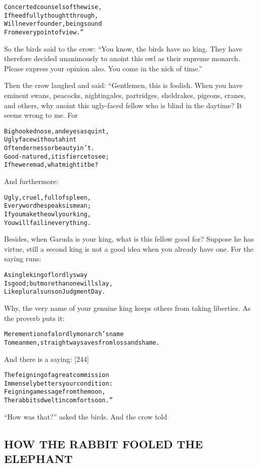 \documentclass{article}
\renewenvironment{verbatim}{\begin{alltt}\normalfont\begin{centering}}{\end{centering}\end{alltt}}
\begin{document}
\begin{verbatim}
Concerted counsels of the wise,
    If heedfully thought through,
Will never founder, being sound
    From every point of view.”
\end{verbatim}
So the birds said to the crow:
``You know, the birds have no king. They have therefore decided unanimously to anoint this owl as their supreme monarch. Please express your opinion also. You come in the nick of time.''

Then the crow laughed and said: “Gentlemen, this is foolish. When
you have eminent swans, peacocks, nightingales, partridges,
sheldrakes, pigeons, cranes, and others, why anoint this ugly-faced
fellow who is blind in the daytime? It seems wrong to me. For

\begin{verbatim}
Big hooked nose, and eyes asquint,
Ugly face without a hint
Of tenderness or beauty in 't.
Good-natured, it is fierce to see;
If he were mad, what might it be?
\end{verbatim}
And furthermore:

\begin{verbatim}
Ugly, cruel, full of spleen,
Every word he speaks is mean;
If you make the owl your king,
You will fail in everything.
\end{verbatim}
Besides, when Garuda is your king, what is this fellow good for?
Suppose he has virtue, still a second king is not a good idea when
you already have one. For the saying runs:

\begin{verbatim}
A single king of lordly sway
Is good; but more than one will slay,
Like plural suns on Judgment Day.
\end{verbatim}
Why, the very name of your genuine king keeps others from taking
liberties. As the proverb puts it:

\begin{verbatim}
Mere mention of a lordly monarch's name
To mean men, straightway saves from loss and shame.
\end{verbatim}
And there is a saying: [244]

\begin{verbatim}
The feigning of a great commission
Immensely betters your condition:
Feigning a message from the moon,
The rabbits dwelt in comfort soon.”
\end{verbatim}
``How was that?'' asked the birds. And the crow told

\subsection{HOW THE RABBIT FOOLED THE ELEPHANT}
\end{document}
